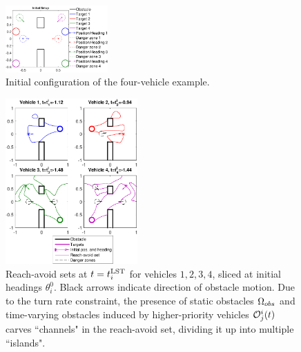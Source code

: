 \begin{figure}
	\centering
	\includegraphics[width=0.35\textwidth]{"fig/dubins_ic"}
	\caption{Initial configuration of the four-vehicle example.}
	\label{fig:dubins_ic}
\end{figure}

\begin{figure}
	\centering
	\includegraphics[width=0.45\textwidth]{"fig/dubins_reach_all"}
	\caption{Reach-avoid sets at $t=t^{\text{LST}}_i$ for vehicles $1,2,3,4$, sliced at initial headings $\theta_i^0$. Black arrows indicate direction of obstacle motion. Due to the turn rate constraint, the presence of static obstacles $\Omega_{obs}$ and time-varying obstacles induced by higher-priority vehicles $\mathcal{O}^i_j(t)$ carves ``channels" in the reach-avoid set, dividing it up into multiple ``islands".}
	\label{fig:dubins_reach_all}
\end{figure}

